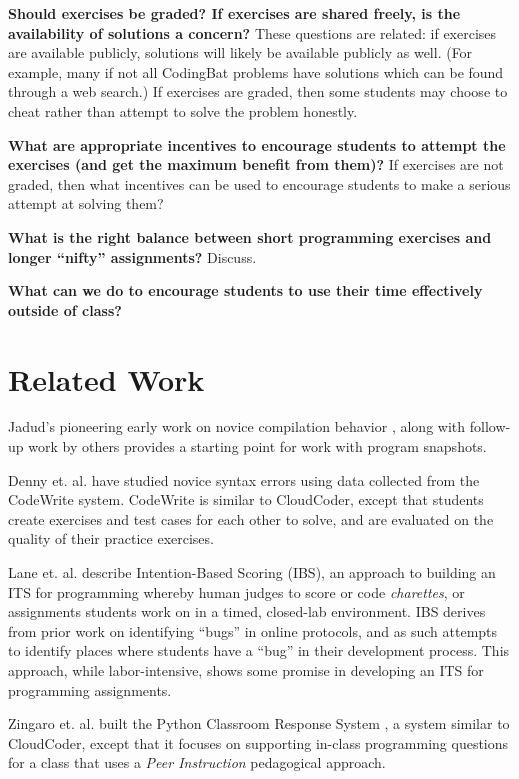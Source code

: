 \documentclass{sig-alternate}
\begin{document}
{\bf Should exercises be graded?
If exercises are shared freely, is the availability of solutions a concern?}
These questions are related: if exercises are available publicly,
solutions will likely be available publicly as well.  (For example,
many if not all CodingBat problems have solutions which can be found
through a web search.)  If exercises are graded, then some students may
choose to cheat rather than attempt to solve the problem honestly.

{\bf What are appropriate incentives to encourage students to attempt
the exercises (and get the maximum benefit from them)?}
If exercises are not graded, then what incentives can be used to
encourage students to make a serious attempt at solving them?

{\bf What is the right balance between short programming exercises and
  longer ``nifty'' assignments?}
Discuss.

{\bf What can we do to encourage students to use their time effectively outside of class?}

\section{Related Work}

Jadud's pioneering early work on novice compilation behavior
\cite{Jadud:2006:MTE:1151588.1151600}, along with follow-up work by
others\cite{Norris:2008:CCQ:1384271.1384284} provides a starting point for
work with program snapshots.

Denny et. al. have studied novice syntax errors
\cite{Denny:2012:SEE:2325296.2325318} using data collected from the CodeWrite system.
CodeWrite is similar to CloudCoder, except that students create
exercises and test cases for each other to solve, and are evaluated on
the quality of their practice exercises.

Lane et. al. describe Intention-Based Scoring (IBS)\cite{Lane:2005:ISA:1047344.1047471},
an approach to building an ITS for programming whereby human
judges to score or code {\em charettes}, or assignments students work on in a
timed, closed-lab environment.  IBS derives from prior work on
identifying ``bugs'' in online protocols, and as such attempts to
identify places where students have a ``bug'' in their development
process.  This approach, while labor-intensive, shows some promise in
developing an ITS for programming assignments.

Zingaro et. al. built the Python Classroom Response System
\cite{Zingaro:2013:FCP:2445196.2445369}, a system similar to
CloudCoder, except that it focuses on supporting in-class programming
questions for a class that uses a {\em Peer Instruction} pedagogical approach.
\end{document}
